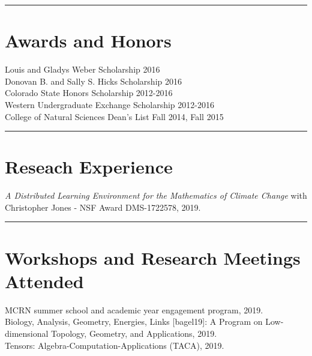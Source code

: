 \documentclass[12pt]{article} %
\begin{document}
\rule{\textwidth}{0.5mm}


\section{Awards and Honors}
\begin{flushleft}
Louis and Gladys Weber Scholarship \hfill 2016\\
\vspace*{5pt}
Donovan B. and Sally S. Hicks Scholarship \hfill 2016\\
\vspace*{5pt}
Colorado State Honors Scholarship \hfill 2012-2016\\
\vspace*{5pt}
Western Undergraduate Exchange Scholarship \hfill 2012-2016\\
\vspace*{5pt}
College of Natural Sciences Dean's List \hfill Fall 2014, Fall 2015\\
\vspace*{5pt}
\end{flushleft}
\rule{\textwidth}{0.5mm}

\section{Reseach Experience}
\begin{flushleft}
    \emph{A Distributed Learning Environment for the Mathematics of Climate Change} with Christopher Jones - NSF Award DMS-1722578, 2019.
\end{flushleft}
\rule{\textwidth}{0.5mm}

\section{Workshops and Research Meetings Attended}

\begin{flushleft}
MCRN summer school and academic year engagement program, 2019.\\
\vspace*{5pt}
Biology, Analysis, Geometry, Energies, Links [bagel19]: A Program on Low-dimensional Topology, Geometry, and Applications, 2019.\\
\vspace*{5pt}
Tensors: Algebra-Computation-Applications (TACA), 2019.\\
\end{flushleft}
\end{document}
